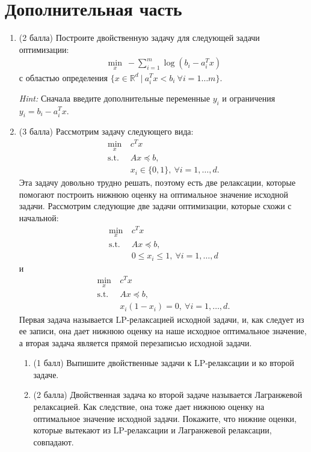 \section*{Дополнительная часть}

\begin{enumerate}[label=\textbf{Задача \arabic*.}]

    \item (2 балла) Построите двойственную задачу для следующей задачи оптимизации:
    \begin{align*}
            \min_{x} \ -\sum\limits_{i=1}^m \log (b_i - a_i^Tx)
    \end{align*}
    с областью определения $\{x \in \mathbb{R}^d \ | \ a_i^Tx < b_i \ \forall i = 1\ldots m\}$.
    
    \textit{Hint:} Сначала введите дополнительные переменные $y_i$ и ограничения $y_i = b_i - a_i^Tx$.

    \item (3 балла) Рассмотрим задачу следующего вида: 
    \begin{align*}
         \min_{x} \ &c^Tx\\
         \text{s.t. } &Ax \preceq b,\\
         &x_i \in \{0, 1\}, \ \forall i = 1, \ldots, d.
     \end{align*}
     Эта задачу довольно трудно решать, поэтому есть две релаксации, которые помогают построить нижнюю оценку на оптимальное значение исходной задачи.
     Рассмотрим следующие две задачи оптимизации, которые схожи с начальной:
     \begin{align*}
         \min_{x} \ &c^Tx\\
         \text{s.t. } &Ax \preceq b,\\
         &0 \leq x_i \leq 1, \ \forall i = 1, \ldots, d
     \end{align*}
     и
     \begin{align*}
         \min_{x} \ &c^Tx\\
         \text{s.t. } &Ax \preceq b,\\
         &x_i(1 - x_i) = 0, \ \forall i = 1, \ldots, d.
     \end{align*}
     Первая задача называется LP-релаксацией исходной задачи, и, как следует из ее записи, она дает нижнюю оценку на наше исходное оптимальное значение, а вторая задача является прямой перезаписью исходной задачи.


    \begin{enumerate}
        \item (1 балл) Выпишите двойственные задачи к LP-релаксации и ко второй задаче.
    
        \item (2 балла) Двойственная задача ко второй задаче называется Лагранжевой релаксацией. Как следствие, она тоже дает нижнюю оценку на оптимальное значение исходной задачи. Покажите, что нижние оценки, которые вытекают из LP-релаксации и Лагранжевой релаксации, совпадают.
    \end{enumerate}

\end{enumerate}